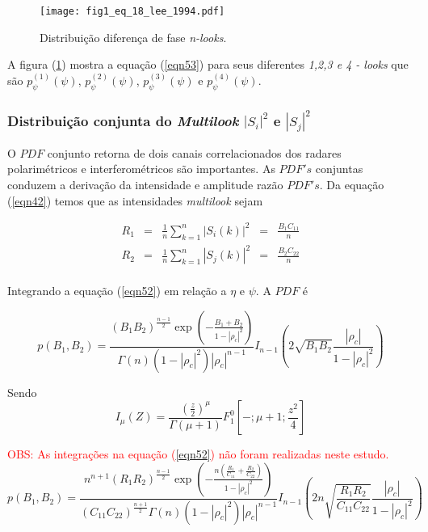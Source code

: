 \begin{figure}[hbt]
\centering
\texttt{[image: fig1\_eq\_18\_lee\_1994.pdf]}
	\caption{Distribuição diferença de fase {\it n-looks}.}
\label{fig1}
\end{figure}



A  figura (\ref{fig1}) mostra a equação (\ref{eqn53}) para seus diferentes {\it 1,2,3 e 4 - looks} que são $p_{\psi}^{(1)}(\psi)$, $p_{\psi}^{(2)}(\psi)$, $p_{\psi}^{(3)}(\psi)$ e $p_{\psi}^{(4)}(\psi)$.

\subsubsection{Distribuição conjunta do {\it Multilook} $|S_i|^2$ e $|S_j|^2$ }

O $PDF$ conjunto retorna de dois canais correlacionados dos radares polarimétricos e interferométricos são importantes. As $PDF's$ conjuntas conduzem a derivação da intensidade e amplitude razão $PDF's$. Da equação (\ref{eqn42}) temos que as intensidades {\it multilook} sejam 

\begin{equation}\label{eqn59}
\begin{array}{ccccc}
	R_1&=&\frac{1}{n}\sum_{k=1}^{n}|S_i(k)|^2&=&\frac{B_1C_{11}}{n}\\
	R_2&=&\frac{1}{n}\sum_{k=1}^{n}|S_j(k)|^2&=&\frac{B_2C_{22}}{n}\\
\end{array}
\end{equation}

Integrando a equação (\ref{eqn52}) em relação a $\eta$ e $\psi$. A $PDF$ é

\begin{equation}\label{eqn60}
	p(B_1,B_2)=\frac{\left(B_1B_2\right)^{\frac{n-1}{2}}\exp\left(-\frac{B_1+B_2}{1-|\rho_c|^2}\right)}{\Gamma(n)(1-|\rho_c|^2)|\rho_c|^{n-1}}I_{n-1}\left(2\sqrt{B_1B_2}\frac{|\rho_c|}{1-|\rho_c|^2}\right)
\end{equation}

Sendo
\begin{equation}\label{eqn61}
	I_{\mu}(Z)=\frac{(\frac{z}{2})^{\mu}}{\Gamma(\mu+1)} F_{1}^{0}[-;\mu+1;\frac{z^2}{4}]
\end{equation}

\textcolor{red}{OBS: As integrações na equação (\ref{eqn52}) não foram realizadas neste estudo.}
\begin{equation}\label{eqn62}
	p(B_1,B_2)=\frac{n^{n+1}\left(R_1R_2\right)^{\frac{n-1}{2}}\exp\left(-\frac{n(\frac{R_1}{C_{11}}+\frac{R_2}{C_{22}})}{1-|\rho_c|^2}\right)}{(C_{11}C_{22})^{\frac{n+1}{2}}\Gamma(n)(1-|\rho_c|^2)|\rho_c|^{n-1}}I_{n-1}\left(2n\sqrt{\frac{R_1R_2}{C_{11}C_{22}}}\frac{|\rho_c|}{1-|\rho_c|^2}\right)
\end{equation}

